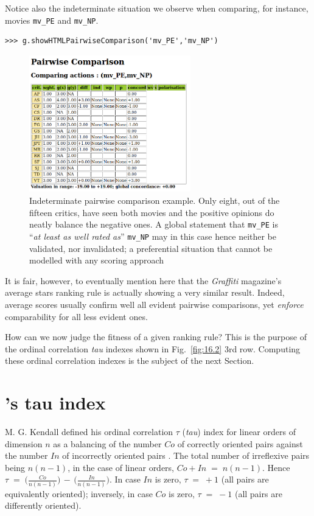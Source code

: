 Notice also the indeterminate situation we observe when comparing, for instance, movies \texttt{mv\_PE} and \texttt{mv\_NP}.
\begin{lstlisting}      
>>> g.showHTMLPairwiseComparison('mv_PE','mv_NP')
\end{lstlisting}
\begin{figure}[h]
\sidecaption
\includegraphics[width=7cm]{Figures/graffiti07_6.png}
\caption{Indeterminate pairwise comparison example. Only eight, out of the fifteen critics, have seen both movies and the positive opinions do neatly balance the negative ones. A global statement that \texttt{mv\_PE} is ``\emph{at least as well rated as}'' \texttt{mv\_NP}  may in this case hence neither be validated, nor invalidated; a preferential situation that cannot be modelled with any scoring approach}
\label{fig:16.5}       %
\end{figure}

It is fair, however, to eventually mention here that the \emph{Graffiti} magazine's average stars ranking rule is actually showing a very similar result. Indeed, average scores usually confirm well all evident pairwise comparisons, yet \emph{enforce} comparability for all less evident ones.

How can we now judge the fitness of a given ranking rule? This is the purpose of the ordinal correlation \emph{tau} indexes shown in Fig.~\vref{fig:16.2} 3rd row. Computing these ordinal correlation indexes is the subject of the next Section.
 
\section{\Kendall 's tau index}
\label{sec:16:6}


M. G. Kendall defined his ordinal correlation $\tau$ (\emph{tau}) index for linear orders of dimension $n$ as a balancing of the number $Co$ of correctly oriented pairs against the number $In$ of incorrectly oriented pairs \citep{KEN-1938}. The total number of irreflexive pairs being $n(n-1)$, in the case of linear orders, $Co + In \;=\; n(n-1)$.  Hence $\tau \;=\; \big(\frac{Co}{n(n-1)}\big) \,-\, \big(\frac{In}{n(n-1)}\big)$. In case $In$ is zero, $\tau \;=\; +1$  (all pairs are equivalently oriented); inversely, in case $Co$ is zero, $\tau \;=\; -1$ (all pairs are differently oriented).

